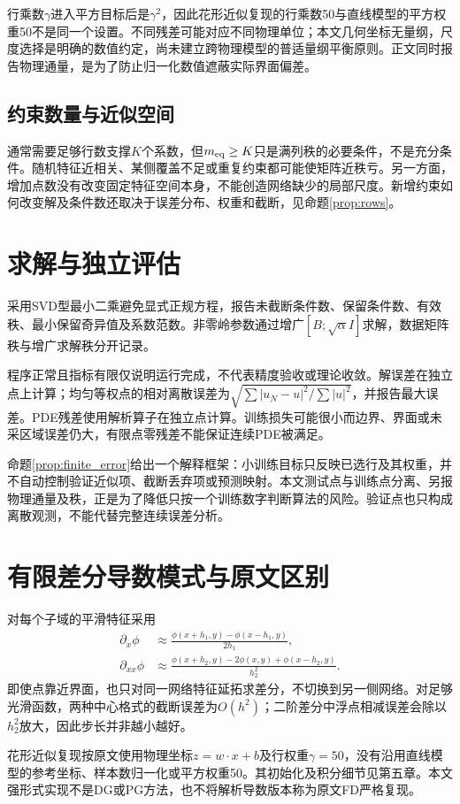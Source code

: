 行乘数$\gamma$进入平方目标后是$\gamma^2$，因此花形近似复现的行乘数50与直线模型的平方权重50不是同一个设置。不同残差可能对应不同物理单位；本文几何坐标无量纲，尺度选择是明确的数值约定，尚未建立跨物理模型的普适量纲平衡原则。正文同时报告物理通量，是为了防止归一化数值遮蔽实际界面偏差。

\subsection{约束数量与近似空间}
通常需要足够行数支撑$K$个系数，但$m_{\rm eq}\ge K$只是满列秩的必要条件，不是充分条件。随机特征近相关、某侧覆盖不足或重复约束都可能使矩阵近秩亏。另一方面，增加点数没有改变固定特征空间本身，不能创造网络缺少的局部尺度。新增约束如何改变解及条件数还取决于误差分布、权重和截断，见命题\ref{prop:rows}。

\section{求解与独立评估}
采用SVD型最小二乘避免显式正规方程，报告未截断条件数、保留条件数、有效秩、最小保留奇异值及系数范数。非零岭参数通过增广$[B;\sqrt\alpha I]$求解，数据矩阵秩与增广求解秩分开记录。

程序正常且指标有限仅说明运行完成，不代表精度验收或理论收敛。解误差在独立点上计算；均匀等权点的相对离散误差为$\sqrt{\sum|u_N-u|^2/\sum|u|^2}$，并报告最大误差。PDE残差使用解析算子在独立点计算。训练损失可能很小而边界、界面或未采区域误差仍大，有限点零残差不能保证连续PDE被满足。

命题\ref{prop:finite_error}给出一个解释框架：小训练目标只反映已选行及其权重，并不自动控制验证近似项、截断丢弃项或预测映射。本文测试点与训练点分离、另报物理通量及秩，正是为了降低只按一个训练数字判断算法的风险。验证点也只构成离散观测，不能代替完整连续误差分析。

\section{有限差分导数模式与原文区别}
对每个子域的平滑特征采用
\begin{align}
\partial_x\phi&\approx\frac{\phi(x+h_1,y)-\phi(x-h_1,y)}{2h_1},\\
\partial_{xx}\phi&\approx\frac{\phi(x+h_2,y)-2\phi(x,y)+\phi(x-h_2,y)}{h_2^2}.
\end{align}
即使点靠近界面，也只对同一网络特征延拓求差分，不切换到另一侧网络。对足够光滑函数，两种中心格式的截断误差为$O(h^2)$；二阶差分中浮点相减误差会除以$h_2^2$放大，因此步长并非越小越好。

花形近似复现按原文使用物理坐标$z=w\cdot x+b$及行权重$\gamma=50$\cite{interfacepreprint}，没有沿用直线模型的参考坐标、样本数归一化或平方权重50。其初始化及积分细节见第五章。本文强形式实现不是DG或PG方法，也不将解析导数版本称为原文FD严格复现。


